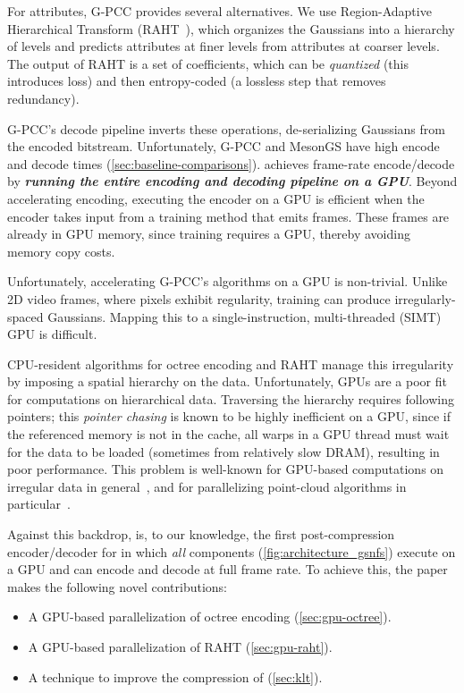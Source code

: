 For attributes, G-PCC provides several alternatives.
%
We use Region-Adaptive Hierarchical Transform (RAHT~\cite{raht,de2016compression}), which organizes the Gaussians into a hierarchy of levels and predicts attributes at finer levels from attributes at coarser levels.
%
The output of RAHT is a set of coefficients, which can be \textit{quantized} (this introduces loss) and then entropy-coded (a lossless step that removes redundancy).

G-PCC's decode pipeline inverts these operations, de-serializing Gaussians from the encoded bitstream.
%
Unfortunately, G-PCC and MesonGS have high encode and decode times (\cref{sec:baseline-comparisons}).
%
\gsnfs{} achieves frame-rate encode/decode by \textbf{\textit{running the entire encoding and decoding pipeline on a GPU}}.
%
Beyond accelerating encoding, executing the encoder on a GPU is efficient when the encoder takes input from a training method that emits \gs{} frames.
%
These frames are already in GPU memory, since \gs{} training requires a GPU, thereby avoiding memory copy costs.

%
Unfortunately, accelerating G-PCC's algorithms on a GPU is non-trivial.
%
Unlike 2D video frames, where pixels exhibit regularity, \gs{} training can produce irregularly-spaced Gaussians.
%
Mapping this to a single-instruction, multi-threaded (SIMT) GPU is difficult.

CPU-resident algorithms for octree encoding and RAHT manage this irregularity by imposing a spatial hierarchy on the data.
%
Unfortunately, GPUs are a poor fit for computations on hierarchical data.
%
Traversing the hierarchy requires following pointers; this \textit{pointer chasing} is known to be highly inefficient on a GPU, since if the referenced memory is not in the cache, all warps in a GPU thread must wait for the data to be loaded (sometimes from relatively slow DRAM), resulting in poor performance.
%
This problem is well-known for GPU-based computations on irregular data in general~\cite{pointer_chasing1,pointer_chasing2}, and for parallelizing point-cloud algorithms in particular~\cite{groot,octree-gpu2011}.

Against this backdrop, \gsnfs{} is, to our knowledge, the first post-compression encoder/decoder for \dgs{} in which \textit{all} components (\cref{fig:architecture_gsnfs}) execute on a GPU and can encode and decode at full frame rate.
%
To achieve this, the paper makes the following novel contributions:
\begin{itemize}
\item A GPU-based parallelization of octree encoding (\cref{sec:gpu-octree}).
\item A GPU-based parallelization of RAHT (\cref{sec:gpu-raht}).
\item A technique to improve the compression of \dgs{} (\cref{sec:klt}). \end{itemize}

